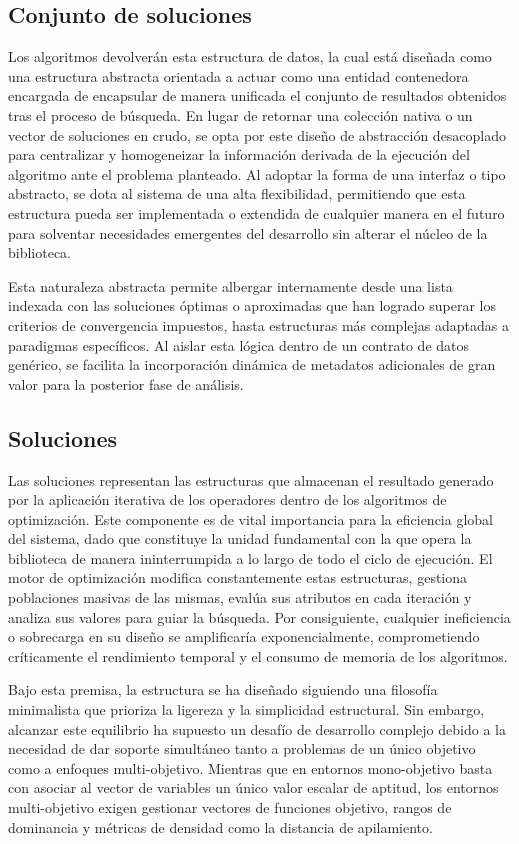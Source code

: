 \documentclass[12pt,a4paper,twoside,openright]{book}
\begin{document}
    \subsection{Conjunto de soluciones}
        Los algoritmos devolverán esta estructura de datos, la cual está diseñada como una estructura abstracta orientada a actuar como una entidad contenedora encargada de encapsular de manera unificada el conjunto de resultados obtenidos tras el proceso de búsqueda. En lugar de retornar una colección nativa o un vector de soluciones en crudo, se opta por este diseño de abstracción desacoplado para centralizar y homogeneizar la información derivada de la ejecución del algoritmo ante el problema planteado. Al adoptar la forma de una interfaz o tipo abstracto, se dota al sistema de una alta flexibilidad, permitiendo que esta estructura pueda ser implementada o extendida de cualquier manera en el futuro para solventar necesidades emergentes del desarrollo sin alterar el núcleo de la biblioteca.

        Esta naturaleza abstracta permite albergar internamente desde una lista indexada con las soluciones óptimas o aproximadas que han logrado superar los criterios de convergencia impuestos, hasta estructuras más complejas adaptadas a paradigmas específicos. Al aislar esta lógica dentro de un contrato de datos genérico, se facilita la incorporación dinámica de metadatos adicionales de gran valor para la posterior fase de análisis.

    \subsection{Soluciones}
        Las soluciones representan las estructuras que almacenan el resultado generado por la aplicación iterativa de los operadores dentro de los algoritmos de optimización. Este componente es de vital importancia para la eficiencia global del sistema, dado que constituye la unidad fundamental con la que opera la biblioteca de manera ininterrumpida a lo largo de todo el ciclo de ejecución. El motor de optimización modifica constantemente estas estructuras, gestiona poblaciones masivas de las mismas, evalúa sus atributos en cada iteración y analiza sus valores para guiar la búsqueda. Por consiguiente, cualquier ineficiencia o sobrecarga en su diseño se amplificaría exponencialmente, comprometiendo críticamente el rendimiento temporal y el consumo de memoria de los algoritmos.
        
        Bajo esta premisa, la estructura se ha diseñado siguiendo una filosofía minimalista que prioriza la ligereza y la simplicidad estructural. Sin embargo, alcanzar este equilibrio ha supuesto un desafío de desarrollo complejo debido a la necesidad de dar soporte simultáneo tanto a problemas de un único objetivo como a enfoques multi-objetivo. Mientras que en entornos mono-objetivo basta con asociar al vector de variables un único valor escalar de aptitud, los entornos multi-objetivo exigen gestionar vectores de funciones objetivo, rangos de dominancia y métricas de densidad como la distancia de apilamiento.
\end{document}
